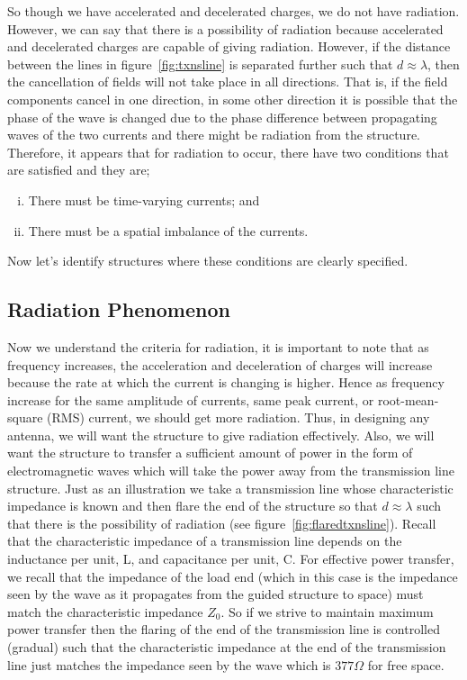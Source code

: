 So though we have accelerated and decelerated charges, we do not have radiation. However, we can say that there is a possibility of radiation because accelerated and decelerated charges are capable of giving radiation. However, if the distance between the lines in figure~\ref{fig:txnsline} is separated further such that $d\approx\lambda$, then the cancellation of fields will not take place in all directions. That is, if the field components cancel in one direction, in some other direction it is possible that the phase of the wave is changed due to the phase difference between propagating waves of the two currents and there might be radiation from the structure.
Therefore, it appears that for radiation to occur, there have two conditions that are satisfied and they are; 
\begin{enumerate}[(i)]
\item There must be time-varying currents; and
\item There must be a spatial imbalance of the currents.
\end{enumerate}
Now let's identify structures where these conditions are clearly specified.

\subsection{Radiation Phenomenon}
Now we understand the criteria for radiation, it is important to note that as frequency increases, the acceleration and deceleration of charges will increase because the rate at which the current is changing is higher. Hence as frequency increase for the same amplitude of currents, same peak current, or root-mean-square (RMS) current, we should get more radiation. Thus, in designing any antenna, we will want the structure to give radiation effectively. Also, we will want the structure to transfer a sufficient amount of power in the form of electromagnetic waves which will take the power away from the transmission line structure. Just as an illustration we take a transmission line whose characteristic impedance is known and then flare the end of the structure so that $d\approx\lambda$ such that there is the possibility of radiation (see figure~\ref{fig:flaredtxnsline}). Recall that the characteristic impedance of a transmission line depends on the inductance per unit, L, and capacitance per unit, C. For effective power transfer, we recall that the impedance of the load end (which in this case is the impedance seen by the wave as it propagates from the guided structure to space) must match the characteristic impedance $Z_0$. So if we strive to maintain maximum power transfer then the flaring of the end of the transmission line is controlled (gradual) such that the characteristic impedance at the end of the transmission line just matches the impedance seen by the wave which is $377\Omega$ for free space.

